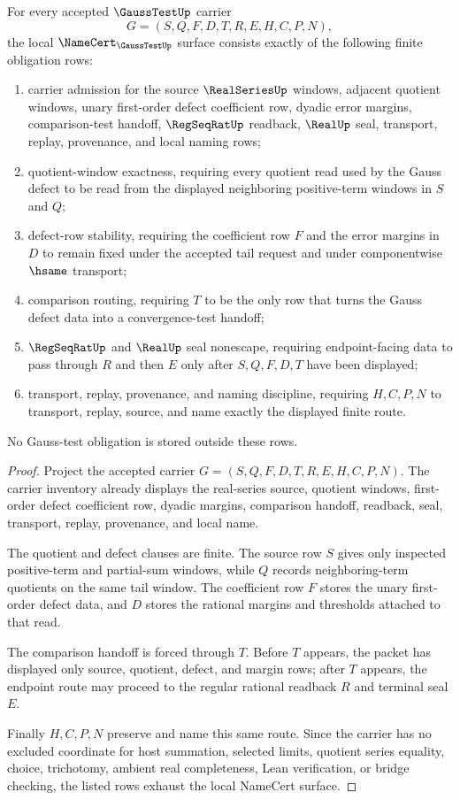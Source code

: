 \begin{theorem}\label{thm:gauss-test-namecert-obligations}
For every accepted $\GaussTestUp$ carrier
$$
G=(S,Q,F,D,T,R,E,H,C,P,N),
$$
the local $\NameCert_{\GaussTestUp}$ surface consists exactly of the following finite obligation rows:
\begin{enumerate}
\item carrier admission for the source $\RealSeriesUp$ windows, adjacent quotient windows, unary first-order defect coefficient row, dyadic error margins, comparison-test handoff, $\RegSeqRatUp$ readback, $\RealUp$ seal, transport, replay, provenance, and local naming rows;
\item quotient-window exactness, requiring every quotient read used by the Gauss defect to be read from the displayed neighboring positive-term windows in $S$ and $Q$;
\item defect-row stability, requiring the coefficient row $F$ and the error margins in $D$ to remain fixed under the accepted tail request and under componentwise $\hsame$ transport;
\item comparison routing, requiring $T$ to be the only row that turns the Gauss defect data into a convergence-test handoff;
\item $\RegSeqRatUp$ and $\RealUp$ seal nonescape, requiring endpoint-facing data to pass through $R$ and then $E$ only after $S,Q,F,D,T$ have been displayed;
\item transport, replay, provenance, and naming discipline, requiring $H,C,P,N$ to transport, replay, source, and name exactly the displayed finite route.
\end{enumerate}
No Gauss-test obligation is stored outside these rows.
\end{theorem}
\begin{proof}
Project the accepted carrier $G=(S,Q,F,D,T,R,E,H,C,P,N)$. The carrier inventory already displays the real-series source, quotient windows, first-order defect coefficient row, dyadic margins, comparison handoff, readback, seal, transport, replay, provenance, and local name.

The quotient and defect clauses are finite. The source row $S$ gives only inspected positive-term and partial-sum windows, while $Q$ records neighboring-term quotients on the same tail window. The coefficient row $F$ stores the unary first-order defect data, and $D$ stores the rational margins and thresholds attached to that read.

The comparison handoff is forced through $T$. Before $T$ appears, the packet has displayed only source, quotient, defect, and margin rows; after $T$ appears, the endpoint route may proceed to the regular rational readback $R$ and terminal seal $E$.

Finally $H,C,P,N$ preserve and name this same route. Since the carrier has no excluded coordinate for host summation, selected limits, quotient series equality, choice, trichotomy, ambient real completeness, Lean verification, or bridge checking, the listed rows exhaust the local NameCert surface.
\end{proof}

